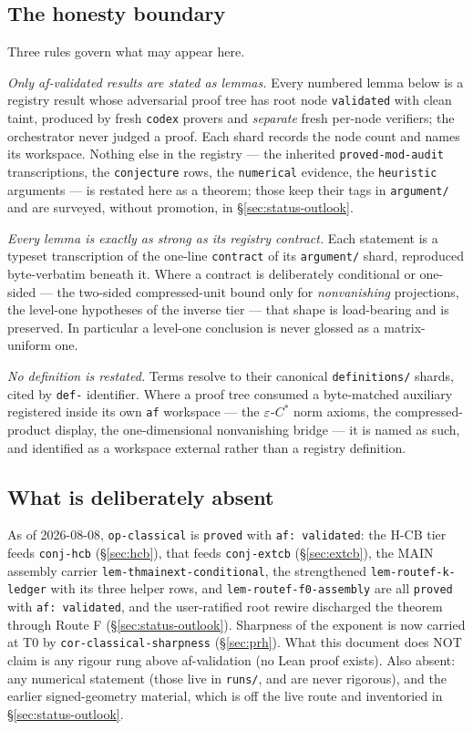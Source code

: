 \subsection*{The honesty boundary}

Three rules govern what may appear here.

\emph{Only af-validated results are stated as lemmas.} Every numbered lemma below is a
registry result whose adversarial proof tree has root node \texttt{validated} with clean
taint, produced by fresh \texttt{codex} provers and \emph{separate} fresh per-node
verifiers; the orchestrator never judged a proof. Each shard records the node count and
names its workspace. Nothing else in the registry --- the inherited
\texttt{proved-mod-audit} transcriptions, the \texttt{conjecture} rows, the
\texttt{numerical} evidence, the \texttt{heuristic} arguments --- is restated here as a
theorem; those keep their tags in \texttt{argument/} and are surveyed, without promotion,
in \S\ref{sec:status-outlook}.

\emph{Every lemma is exactly as strong as its registry contract.} Each statement is a
typeset transcription of the one-line \texttt{contract} of its \texttt{argument/} shard,
reproduced byte-verbatim beneath it. Where a contract is deliberately conditional or
one-sided --- the two-sided compressed-unit bound only for \emph{nonvanishing}
projections, the level-one hypotheses of the inverse tier --- that shape is load-bearing
and is preserved. In particular a level-one conclusion is never glossed as a
matrix-uniform one.

\emph{No definition is restated.} Terms resolve to their canonical
\texttt{definitions/} shards, cited by \texttt{def-} identifier. Where a proof tree
consumed a byte-matched auxiliary registered inside its own \texttt{af} workspace ---
the $\varepsilon$-$C^*$ norm axioms, the compressed-product display, the one-dimensional
nonvanishing bridge --- it is named as such, and identified as a workspace external
rather than a registry definition.

\subsection*{What is deliberately absent}

As of 2026-08-08, \texttt{op-classical} is \texttt{proved} with \texttt{af: validated}:
the H-CB tier feeds \texttt{conj-hcb} (\S\ref{sec:hcb}), that feeds \texttt{conj-extcb}
(\S\ref{sec:extcb}), the MAIN assembly carrier \texttt{lem-thmainext-conditional}, the
strengthened \texttt{lem-routef-k-ledger} with its three helper rows, and
\texttt{lem-routef-f0-assembly} are all \texttt{proved} with \texttt{af: validated}, and
the user-ratified root rewire discharged the theorem through Route F
(\S\ref{sec:status-outlook}). Sharpness of the exponent is now carried at T0 by
\texttt{cor-classical-sharpness} (\S\ref{sec:prh}). What this document does NOT claim is
any rigour rung above af-validation (no Lean proof exists).
Also absent: any numerical statement (those live in
\texttt{runs/}, and are never rigorous), and the earlier signed-geometry material, which
is off the live route and inventoried in \S\ref{sec:status-outlook}.
